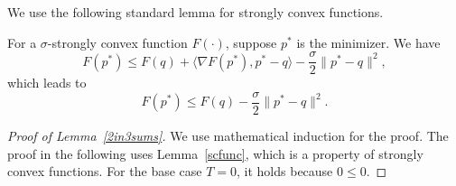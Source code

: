 \documentclass[pmlr]{jmlr} %
\begin{document}
We use the following standard lemma for strongly convex functions.
\begin{lemma} \label{scfunc}
	For a $\sigma$-strongly convex function $F(\cdot)$, suppose $p^{*}$ is the minimizer. We have \[F(p^{*}) \leq F(q) + \langle \nabla F(p^{*}), p^{*}- q  \rangle - \frac{\sigma}{2} \|  p^{*} - q \|^{2},\] which leads to
	\[F(p^{*}) \leq F(q)  - \frac{\sigma}{2} \| p^{*} - q \|^{2}.\]
\end{lemma}




\begin{proof}[Proof of Lemma~\ref{2in3sums}]

We use mathematical induction for the proof.
The proof in the following uses Lemma~\ref{scfunc}, which is a property of strongly convex functions.
For the base case $T=0$, it holds because $0\leq0$.


\end{proof}
\end{document}
